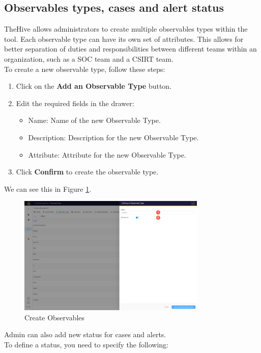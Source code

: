 \documentclass{article}
\begin{document}
  \subsection{Observables types, cases and alert status}
TheHive allows administrators to create multiple observables types within the tool. Each observable type can have its own set of attributes. This allows for better separation of duties and responsibilities between different teams within an organization, such as a SOC team and a CSIRT team.\\
To create a new observable type, follow these steps: \\
\begin{enumerate}
\item  Click on the \textbf{Add an Observable Type} button.
\item  Edit the required fields in the drawer:
   \begin{itemize}
        \item Name: Name of the new Observable Type.
        \item Description: Description for the new Observable Type.
        \item Attribute: Attribute for the new Observable Type.
    \end{itemize}
\item Click \textbf{Confirm} to create the observable type.
\end{enumerate}

We can see this in Figure \ref{fig:observables}.
\begin{figure}[H]
    \centering
    \includegraphics[width=0.8\textwidth]{observable-types.png}
    \caption{Create Observables}
    \label{fig:observables}
\end{figure}

Admin can also add new status for cases and alerts.\\
To define a status, you need to specify the following:
\end{document}
